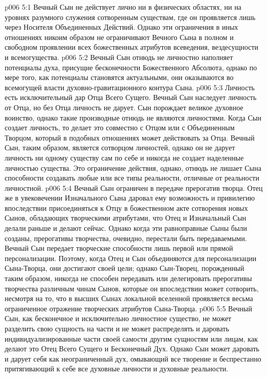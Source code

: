 \vs p006 5:1 Вечный Сын не действует лично ни в физических областях, ни на уровнях разумного служения сотворенным существам, где он проявляется лишь через Носителя Объединенных Действий. Однако эти ограничения в иных отношениях никоим образом не ограничивают Вечного Сына в полном и свободном проявлении всех божественных атрибутов  всеведения, вездесущности и всемогущества.
\vs p006 5:2 Вечный Сын отнюдь не личностно наполняет потенциалы духа, присущие бесконечности Божественного Абсолюта, однако по мере того, как потенциалы становятся актуальными, они оказываются во всемогущей власти духовно\hyp{}гравитационного контура Сына.
\vs p006 5:3 Личность есть исключительный дар Отца Всего Сущего. Вечный Сын наследует личность от Отца, но без Отца личность не дарует. Сын порождает великое духовное воинство, однако такие производные отнюдь не являются личностями. Когда Сын создает личность, то делает это совместно с Отцом или с Объединенным Творцом, который в подобных отношениях может действовать за Отца. Вечный Сын, таким образом, является сотворцом личностей, однако он не дарует личность ни одному существу сам по себе и никогда не создает наделенные личностью существа. Это ограничение действия, однако, отнюдь не лишает Сына способности создавать любые или все типы реальности, отличные от реальности личностной.
\vs p006 5:4 Вечный Сын ограничен в передаче прерогатив творца. Отец же в увековечении Изначального Сына даровал ему возможность и привилегию впоследствии присоединяться к Отцу в божественном акте сотворения новых Сынов, обладающих творческими атрибутами, что Отец и Изначальный Сын делали раньше и делают сейчас. Однако когда эти равноправные Сыны были созданы, прерогативы творчества, очевидно, перестали быть передаваемыми. Вечный Сын передает творческие способности лишь первой или прямой персонализации. Поэтому, когда Отец и Сын объединяются для персонализации Сына\hyp{}Творца, они достигают своей цели; однако Сын\hyp{}Творец, порожденный таким образом, никогда не способен передавать или делегировать прерогативы творчества различным чинам Сынов, которые он впоследствии может сотворить, несмотря на то, что в высших Сынах локальной вселенной проявляется весьма ограниченное отражение творческих атрибутов Сына\hyp{}Творца.
\vs p006 5:5 Вечный Сын, как бесконечное и исключительно личностное существо, не может разделить свою сущность на части и не может распределять и даровать индивидуализированные части своей самости другим сущностям или лицам, как делают это Отец Всего Сущего и Бесконечный Дух. Однако Сын может даровать и дарует себя как неограниченный дух, омывающий все творение и беспрестанно притягивающий к себе все духовные личности и духовные реальности.
